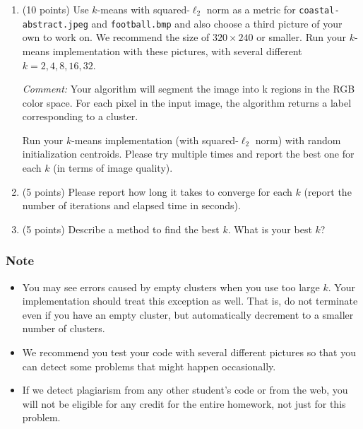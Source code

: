 \documentclass[twoside,10pt]{article}
\begin{document}
\begin{enumerate}
 
\item  (10 points) Use $k$-means with squared-$\ell_2$ norm as a metric for \texttt{coastal-abstract.jpeg} and \texttt{football.bmp} and also choose a third picture of your own to work on. We recommend the size of $320 \times 240$ or smaller. Run your $k$-means implementation with these pictures, with several different $k = 2, 4, 8, 16, 32$. 
  
{\it Comment:}  Your algorithm will segment the image into k regions in the RGB color space. For each pixel in the input image, the algorithm returns a label corresponding to a cluster.
  
Run your $k$-means implementation (with squared-$\ell_2$ norm) with random initialization centroids. Please try multiple times and report the best one for each $k$ (in terms of image quality).
  
\item (5 points) Please  report how long it takes to converge for each $k$ (report the number of iterations and elapsed time in seconds).

\item (5 points) Describe a method to find the best $k$. What is your best $k$?

\end{enumerate}
  


\subsubsection*{Note}
\begin{itemize}
  \item You may see errors caused by empty clusters when you use too large $k$. Your implementation should treat this exception as well. That is, do not terminate even if you have an empty cluster, but automatically decrement to a smaller number of clusters.

  \item We recommend you test your code with several different pictures so that you can detect some problems that might happen occasionally. 

  \item If we detect plagiarism from any other student's code or from the web, you will not be eligible for any credit for the entire homework, not just for this problem.
\end{itemize}
\end{document}
